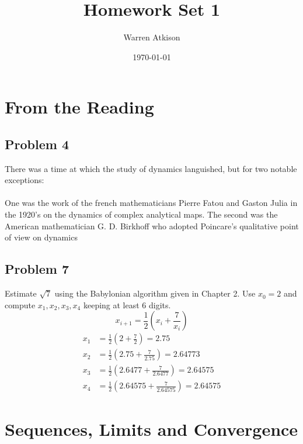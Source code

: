 \documentclass{article}
\title{Homework Set 1}
\author{Warren Atkison}
\date{\today}
\begin{document}
\maketitle

\section*{From the Reading}
\subsection*{Problem 4}
There was a time at which the study of dynamics languished, but for two notable exceptions: 
\paragraph*{}
One was the work of the french mathematicians Pierre Fatou and Gaston Julia in the 1920's on the dynamics of complex analytical maps. The second was the American mathematician G. D. Birkhoff who adopted Poincare's qualitative point of view on dynamics 
\subsection*{Problem 7}
Estimate $\sqrt{7}$ using the Babylonian algorithm given in Chapter 2. Use $x_0 = 2$ and compute $x_1,x_2,x_3,x_4$ keeping at least 6 digits.
\[
	x_{i+1} = \frac{1}{2}\left(x_i + \frac{7}{x_i}\right)
\]
\begin{align*}
	x_1 &= \frac{1}{2}\left(2 + \frac{7}{2}\right) = 2.75 \\
	x_2 &= \frac{1}{2}\left(2.75 + \frac{7}{2.75}\right) = 2.64773 \\
	x_3 &= \frac{1}{2}\left(2.6477 + \frac{7}{2.6477}\right) = 2.64575 \\
	x_4 &= \frac{1}{2}\left(2.64575 + \frac{7}{2.64575}\right) = 2.64575
\end{align*}
\section*{Sequences, Limits and Convergence}
\end{document}
